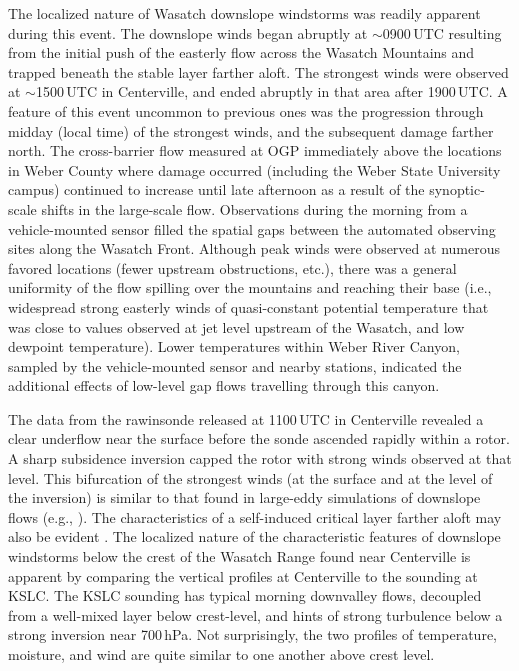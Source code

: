 \documentclass[pdftex,12pt]{article}
\def\around{$\sim$}
\begin{document}
The localized nature of Wasatch downslope windstorms was readily apparent during this event. The downslope winds began abruptly at \around 0900\,UTC resulting from the initial push of the easterly flow across the Wasatch Mountains and trapped beneath the stable layer farther aloft. The strongest winds were observed at \around 1500\,UTC in Centerville, and ended abruptly in that area after 1900\,UTC. A feature of this event uncommon to previous ones was the progression through midday (local time) of the strongest winds, and the subsequent damage farther north. The cross-barrier flow measured at OGP immediately above the locations in Weber County where damage occurred (including the Weber State University campus) continued to increase until late afternoon as a result of the synoptic-scale shifts in the large-scale flow. Observations during the morning from a vehicle-mounted sensor filled the spatial gaps between the automated observing sites along the Wasatch Front. Although peak winds were observed at numerous favored locations (fewer upstream obstructions, etc.), there was a general uniformity of the flow spilling over the mountains and reaching their base (i.e., widespread strong easterly winds of quasi-constant potential temperature that was close to values observed at jet level upstream of the Wasatch, and low dewpoint temperature). Lower temperatures within Weber River Canyon, sampled by the vehicle-mounted sensor and nearby stations, indicated the additional effects of low-level gap flows travelling through this canyon.


The data from the rawinsonde released at 1100\,UTC in Centerville revealed a clear underflow near the surface \citep{Armi2011} before the sonde ascended rapidly within a rotor. A sharp subsidence inversion capped the rotor with strong winds observed at that level. This bifurcation of the strongest winds (at the surface and at the level of the inversion) is similar to that found in large-eddy simulations of downslope flows (e.g., \citealt{Hertenstein2009}). The characteristics of a self-induced critical layer farther aloft may also be evident \citep{Peltier1979}. The localized nature of the characteristic features of downslope windstorms below the crest of the Wasatch Range found near Centerville is apparent by comparing the vertical profiles at Centerville to the sounding at KSLC. The KSLC sounding has typical morning downvalley flows, decoupled from a well-mixed layer below crest-level, and hints of strong turbulence below a strong inversion near 700\,hPa. Not surprisingly, the two profiles of temperature, moisture, and wind are quite similar to one another above crest level.
\end{document}
